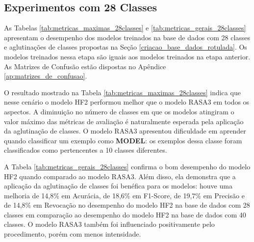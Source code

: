 \subsection{Experimentos com 28 Classes}
As Tabelas \ref{tab:metricas_maximas_28classes} e \ref{tab:metricas_gerais_28classes} apresentam o desempenho dos modelos treinados na base de dados com 28 classes e aglutinações de classes propostas na Seção \ref{criacao_base_dados_rotulada}. Os modelos treinados nessa etapa são iguais aos modelos treinados na etapa anterior. As Matrizes de Confusão estão dispostas no Apêndice \ref{ap:matrizes_de_confusao}.

O resultado mostrado na Tabela \ref{tab:metricas_maximas_28classes} indica que nesse cenário o modelo HF2 performou melhor que o modelo RASA3 em todos os aspectos. A diminuição no número de classes em que os modelos atingiram o valor máximo das métricas de avaliação é naturalmente esperada pela aplicação da aglutinação de classes. O modelo RASA3 apresentou dificuldade em aprender quando classificar um exemplo como \textbf{MODEL}: os exemplos dessa classe foram classificados como pertencentes a 10 classes diferentes.

\begin{table}[!ht]
\centering
\caption{Número de classes que atingiram o valor máximo e o valor mínimo das métricas de avaliação (base de dados com 28 classes)}
\label{tab:metricas_maximas_28classes}
\end{table}

A Tabela \ref{tab:metricas_gerais_28classes} confirma o bom desempenho do modelo HF2 quando comparado ao modelo RASA3. Além disso, ela demonstra que a aplicação da aglutinação de classes foi benéfica para os modelos: houve uma melhoria de 14,8\% em Acurácia, de 18,6\% em F1-Score, de 19,7\% em Precisão e de 14,8\% em Revocação no desempenho do modelo HF2 na base de dados com 28 classes em comparação ao desempenho do modelo HF2 na base de dados com 40 classes. O modelo RASA3 também foi influenciado positivamente pelo procedimento, porém com menos intensidade.

